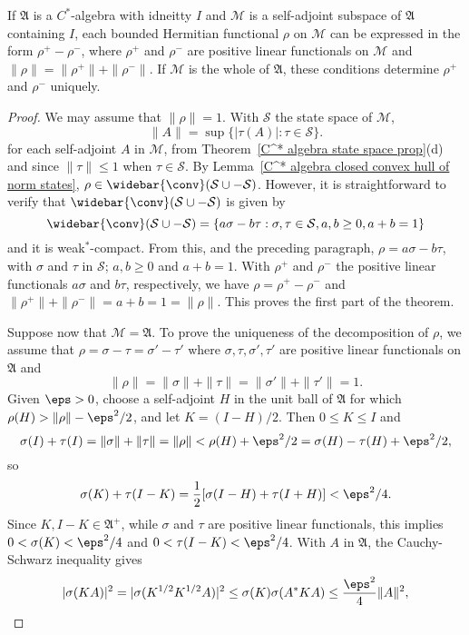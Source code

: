 \begin{theorem}\label{C^* algebra decomposition}
If $\mathfrak{A}$ is a $C^*$-algebra with idneitty $I$ and $\mathscr{M}$ is a self-adjoint subspace of $\mathfrak{A}$ containing $I$, each bounded Hermitian functional $\rho$ on $\mathscr{M}$ can be expressed in the form $\rho^+-\rho^-$, where $\rho^+$ and $\rho^-$ are positive linear functionals on $\mathscr{M}$ and $\|\rho\|=\|\rho^+\|+\|\rho^-\|$. If $\mathscr{M}$ is the whole of $\mathfrak{A}$, these conditions determine $\rho^+$ and $\rho^-$ uniquely.
\end{theorem}
\begin{proof}
We may assume that $\|\rho\|=1$. With $\mathcal{S}$ the state space of $\mathscr{M}$,
\[\|A\|=\sup\{|\tau(A)|:\tau\in\mathcal{S}\}.\]
for each self-adjoint $A$ in $\mathscr{M}$, from Theorem~\ref{C^* algebra state space prop}(d) and since $\|\tau\|\leq 1$ when $\tau\in\mathcal{S}$. By Lemma~\ref{C^* algebra closed convex hull of norm states}, $\rho\in\widebar{\conv}(\mathcal{S}\cup-\mathcal{S})$. However, it is straightforward to verify that $\widebar{\conv}(\mathcal{S}\cup-\mathcal{S})$ is given by
\[\widebar{\conv}(\mathcal{S}\cup-\mathcal{S})=\{a\sigma-b\tau:\sigma,\tau\in\mathcal{S},a,b\geq 0,a+b=1\}\]
and it is weak$^*$-compact. From this, and the preceding paragraph, $\rho=a\sigma-b\tau$, with $\sigma$ and $\tau$ in $\mathcal{S}$; $a,b\geq 0$ and $a+b=1$. With $\rho^+$ and $\rho^-$ the positive linear functionals $a\sigma$ and $b\tau$, respectively, we have $\rho=\rho^+-\rho^-$ and $\|\rho^+\|+\|\rho^-\|=a+b=1=\|\rho\|$. This proves the first part of the theorem.\par
Suppose now that $\mathscr{M}=\mathfrak{A}$. To prove the uniqueness of the decomposition of $\rho$, we assume that $\rho=\sigma-\tau=\sigma'-\tau'$ where $\sigma,\tau,\sigma',\tau'$ are positive linear functionals on $\mathfrak{A}$ and
\[\|\rho\|=\|\sigma\|+\|\tau\|=\|\sigma'\|+\|\tau'\|=1.\]
Given $\eps>0$, choose a self-adjoint $H$ in the unit ball of $\mathfrak{A}$ for which $\rho(H)>\|\rho\|-\eps^2/2$, and let $K=(I-H)/2$. Then $0\leq K\leq I$ and
\[\sigma(I)+\tau(I)=\|\sigma\|+\|\tau\|=\|\rho\|<\rho(H)+\eps^2/2=\sigma(H)-\tau(H)+\eps^2/2,\]
so
\[\sigma(K)+\tau(I-K)=\frac{1}{2}[\sigma(I-H)+\tau(I+H)]<\eps^2/4.\]
Since $K,I-K\in\mathfrak{A}^+$, while $\sigma$ and $\tau$ are positive linear functionals, this implies $0<\sigma(K)<\eps^2/4$ and $0<\tau(I-K)<\eps^2/4$. With $A$ in $\mathfrak{A}$, the Cauchy-Schwarz inequality gives
\begin{align*}
|\sigma(KA)|^2&=|\sigma(K^{1/2}K^{1/2}A)|^2\leq\sigma(K)\sigma(A^*KA)\leq\frac{\eps^2}{4}\|A\|^2,\\

\end{align*}
\end{proof}
